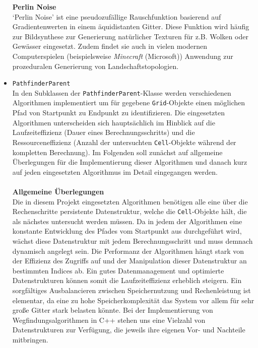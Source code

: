 \begin{itemize}
    \textbf{Perlin Noise}\\
    `Perlin Noise' ist eine pseudozufällige Rauschfunktion basierend auf Gradientenwerten in einem äquidistanten Gitter.
    Diese Funktion wird häufig zur Bildsynthese zur Generierung natürlicher Texturen für z.B. Wolken oder Gewässer eingesetzt.
    Zudem findet sie auch in vielen modernen Computerspielen (beispielsweise \textit{Minecraft} (Microsoft)) Anwendung zur
    prozeduralen Generierung von Landschaftstopologien.
    \item \texttt{PathfinderParent}\\
    In den Subklassen der \texttt{PathfinderParent}-Klasse werden verschiedenen Algorithmen implementiert um für gegebene
    \texttt{Grid}-Objekte einen möglichen Pfad von Startpunkt zu Endpunkt zu identifizieren.
    Die eingesetzten Algorithmen unterscheiden sich hauptsächlich im Hinblick auf die Laufzeiteffizienz (Dauer eines Berechnungsschritts)
    und die Ressourceneffizienz (Anzahl der untersuchten \texttt{Cell}-Objekte während der kompletten Berechnung).
    Im Folgenden soll zunächst auf allgemeine Überlegungen für die Implementierung dieser Algorithmen und danach kurz auf
    jeden eingesetzten Algorithmus im Detail eingegangen werden.\\\\
    \textbf{Allgemeine Überlegungen}\\
    Die in diesem Projekt eingesetzten Algorithmen benötigen alle eine über die Rechenschritte persistente Datenstruktur,
    welche die \texttt{Cell}-Objekte hält, die als nächstes untersucht werden müssen.
    Da in jedem der Algorithmen eine konstante Entwicklung des Pfades vom Startpunkt aus durchgeführt wird, wächst diese
    Datenstruktur mit jedem Berechnungsschritt und muss demnach dynamisch angelegt sein.
    Die Performanz der Algorithmen hängt stark von der Effizienz des Zugriffs auf und der Manipulation dieser Datenstruktur an bestimmten Indices ab.
    Ein gutes Datenmanagement und optimierte Datenstrukturen können somit die Laufzeiteffizienz erheblich steigern.
    Ein sorgfältiges Ausbalancieren zwischen Speichernutzung und Rechenleistung ist elementar, da eine zu hohe Speicherkomplexität
    das System vor allem für sehr große Gitter stark belasten könnte.
    Bei der Implementierung von Wegfindungsalgorithmen in C++ stehen uns eine Vielzahl von Datenstrukturen zur Verfügung,
    die jeweils ihre eigenen Vor- und Nachteile mitbringen. \cite{iso2020}
    \begin{itemize}

\end{itemize}
\end{itemize}
